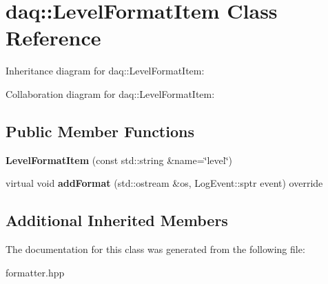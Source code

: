 \hypertarget{classdaq_1_1LevelFormatItem}{}\section{daq\+:\+:Level\+Format\+Item Class Reference}
\label{classdaq_1_1LevelFormatItem}


Inheritance diagram for daq\+:\+:Level\+Format\+Item\+:


Collaboration diagram for daq\+:\+:Level\+Format\+Item\+:
\subsection*{Public Member Functions}
\begin{DoxyCompactItemize}
\item 
\mbox{\label{classdaq_1_1LevelFormatItem_a03135a8379ec6208e4a2c9db3821600e}} 
{\bfseries Level\+Format\+Item} (const std\+::string \&name=\char`\"{}level\char`\"{})
\item 
\mbox{\label{classdaq_1_1LevelFormatItem_afad2c25714060a246b0643b62dcaf026}} 
virtual void {\bfseries add\+Format} (std\+::ostream \&os, Log\+Event\+::sptr event) override
\end{DoxyCompactItemize}
\subsection*{Additional Inherited Members}


The documentation for this class was generated from the following file\+:\begin{DoxyCompactItemize}
\item 
formatter.\+hpp\end{DoxyCompactItemize}
